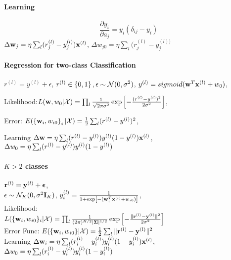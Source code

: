     \paragraph{Learning} 
        \[\frac{\partial y_i}{\partial a_j} = y_i (\delta_{ij}-y_i)\]
        $\Delta\mathbf{w}_j = \eta\sum_l(r_j^{(l)}-y_j^{(l)})\mathbf{x}^{(l)}$, $
        \Delta w_{j0} = \eta\sum_l(r_j^{(l)}-y_j^{(l))}$
    \paragraph{Regression for two-class Classification} $r^{(l)} = y^{(l)}+\epsilon$,
        $r^{(l)}\in \left\{ 0,1 \right\}, \epsilon \sim \mathcal{N}(0, \sigma^2)$,
        $y^{(l)} = sigmoid(\mathbf{w}^T\mathbf{x}^{(l)}+w_0)$,

        Likelihood:$L(\mathbf{w}, w_0|\mathcal{X}) =
        \prod_l\frac{1}{\sqrt{2\pi\sigma^2}}\exp\left[
        -\frac{(r^{(l)}-y^{(l)})^2}{2\sigma^2} \right]$, 

        Error: $E(\left\{ \mathbf{w}_i, w_{i0} \right\}_i|\mathcal{X}) =
        \frac{1}{2}\sum_l(r^{(l)}-y^{(l)})^2$, 

        Learning $\Delta \mathbf{w} = \eta\sum_l(r^{(l)} - y^{(l)})y^{(l)}(1-y^{(l)})\mathbf{x}^{(l)}$, \\$\Delta
        w_0 = \eta\sum_l(r^{(l)}-y^{(l)})y^{(l)}(1-y^{(l)})$
    \paragraph{$K>2$ classes} $\mathbf{r}^{(l)} = \mathbf{y}^{(l)} +\boldsymbol\epsilon$, \\$\epsilon\sim
        \mathcal{N}_K(0, \sigma^2\mathbf{I}_K)$, $y^{(l)}_i = \frac{1}{1+\exp\left[
            -(\mathbf{w}_i^T\mathbf{x}^{(l)} + w_{i0})
        \right]}$, \\
        Likelihood:\\$L(\{\mathbf{w}_i, w_{i0}\}_i|\mathcal{X}) =
        \prod_l\frac{1}{(2\pi)^{K/2}|\boldsymbol\Sigma|^{1/2}}\exp\left[ -\frac{\|\mathbf{r}^{(l)} -
        \mathbf{y}^{(l)}\|^2}{2\sigma^2} \right]$\\
        Error Func: $E(\{\mathbf{w}_i, w_{i0}\}|\mathcal{X}) =
        \frac{1}{2}\sum_l\|\mathbf{r}^{(l)}-\mathbf{y}^{(l)}\|^2$\\
        Learning $\Delta \mathbf{w}_i = \eta\sum_l(r^{(l)}_i - y^{(l)}_i)y^{(l)}_i(1-y^{(l)}_i)\mathbf{x}^{(l)}$,\\ $\Delta
        w_0 = \eta\sum_l(r^{(l)}_i-y^{(l)}_i)y^{(l)}_i(1-y^{(l)}_i)$
